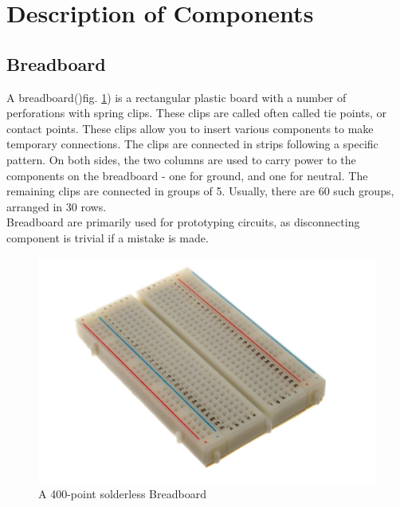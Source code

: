 \documentclass{article}
\begin{document}

\section{Description of Components}
\subsection{Breadboard}
A breadboard()fig. \ref{fig:400pointsbreadboard}) is a rectangular plastic board with a number of perforations with spring clips. These clips are called often called tie points, or contact points. These clips allow you to insert various components to make temporary connections. The clips are connected in strips following a specific pattern. On both sides, the two columns are used to carry power to the components on the breadboard - one for ground, and one for neutral. The remaining clips are connected in groups of 5. Usually, there are 60 such groups, arranged in 30 rows. \\
Breadboard are primarily used for prototyping circuits, as disconnecting component is trivial if a mistake is made.
\begin{figure}[h]
	\centering
	\includegraphics[width=0.7\linewidth]{400_points_breadboard}
	\caption[A Breadboard]{A 400-point solderless Breadboard}
	\label{fig:400pointsbreadboard}
\end{figure}
\end{document}
